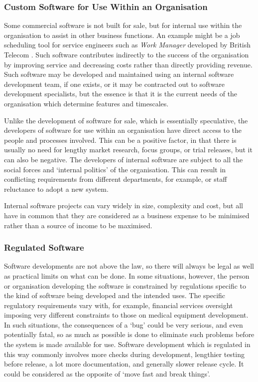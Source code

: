 \subsubsection{Custom Software for Use Within an Organisation}

Some commercial software is not built for sale, but for internal use within the organisation to assist in other business functions. An example might be a job scheduling tool for service engineers such as \emph{Work Manager} developed by British Telecom \citep{Garwood1997}. Such software contributes indirectly to the success of the organisation by improving service and decreasing costs rather than directly providing revenue. Such software may be developed and maintained using an internal software development team, if one exists, or it may be contracted out to software development specialists, but the essence is that it is the current needs of the organisation which determine features and timescales.

Unlike the development of software for sale, which is essentially speculative, the developers of software for use within an organisation have direct access to the people and processes involved. This can be a positive factor, in that there is usually no need for lengthy market research, focus groups, or trial releases, but it can also be negative. The developers of internal software are subject to all the social forces and `internal politics' of the organisation. This can result in conflicting requirements from different departments, for example, or staff reluctance to adopt a new system.

Internal software projects can vary widely in size, complexity and cost, but all have in common that they are considered as a business expense to be minimised rather than a source of income to be maximised.

\subsubsection{Regulated Software}

Software developments are not above the law, so there will always be legal as well as practical limits on what can be done. In some situations, however, the person or organisation developing the software is constrained by regulations specific to the kind of software being developed and the intended uses. The specific regulatory requirements vary with, for example, financial services oversight imposing very different constraints to those on medical equipment development. In such situations, the consequences of a `bug' could be very serious, and even potentially fatal, so as much as possible is done to eliminate such problems before the system is made available for use. Software development which is regulated in this way commonly involves more checks during development, lengthier testing before release, a lot more documentation, and generally slower release cycle. It could be considered as the opposite of `move fast and break things'.

